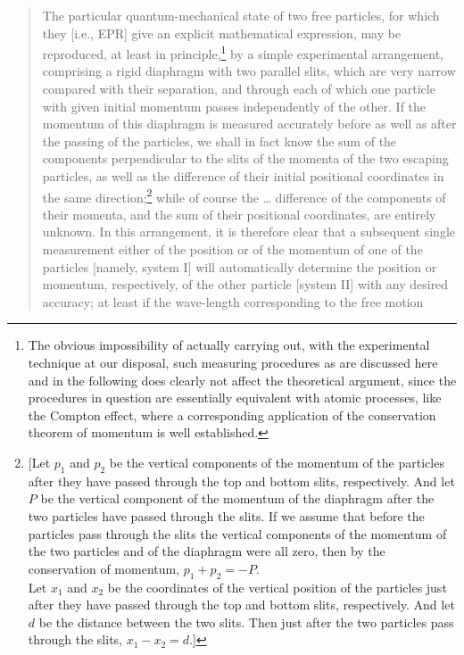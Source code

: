 \begin{quote}
The particular quantum-mechanical state of two free particles, for which
they {[}i.e., EPR{]} give an explicit mathematical expression, may be
reproduced, at least in principle,\footnote{The obvious impossibility of
  actually carrying out, with the experimental technique at our
  disposal, such measuring procedures as are discussed here and in the
  following does clearly not affect the theoretical argument, since the
  procedures in question are essentially equivalent with atomic
  processes, like the Compton effect, where a corresponding application
  of the conservation theorem of momentum is well established.} by a
simple experimental arrangement, comprising a rigid diaphragm with two
parallel slits, which are very narrow compared with their separation,
and through each of which one particle with given initial momentum
passes independently of the other. If the momentum of this diaphragm is
measured accurately before as well as after the passing of the
particles, we shall in fact know the sum of the components perpendicular
to the slits of the momenta of the two escaping particles, as well as
the difference of their initial positional coordinates in the same
direction;\footnote{{[}Let $p_1$ and $p_2$ be the vertical
  components of the momentum of the particles after they have passed
  through the top and bottom slits, respectively. And let $P$ be
  the vertical component of the momentum of the diaphragm after the two
  particles have passed through the slits. If we assume that before the
  particles pass through the slits the vertical components of the
  momentum of the two particles and of the diaphragm were all zero, then
  by the conservation of momentum, $p_1 + p_2 = -P$.\\
  Let $x_1$ and $x_2$ be the coordinates of the vertical
  position of the particles just after they have passed through the top
  and bottom slits, respectively. And let $d$ be the distance
  between the two slits. Then just after the two particles pass through
  the slits, $x_1 - x_2 = d$.]} while of course the
\ldots{} difference of the components of their momenta, and the sum of
their positional coordinates, are entirely unknown. In this arrangement,
it is therefore clear that a subsequent single measurement either of the
position or of the momentum of one of the particles {[}namely, system
I{]} will automatically determine the position or momentum,
respectively, of the other particle {[}system II{]} with any desired
accuracy; at least if the wave-length corresponding to the free motion

\end{quote}
